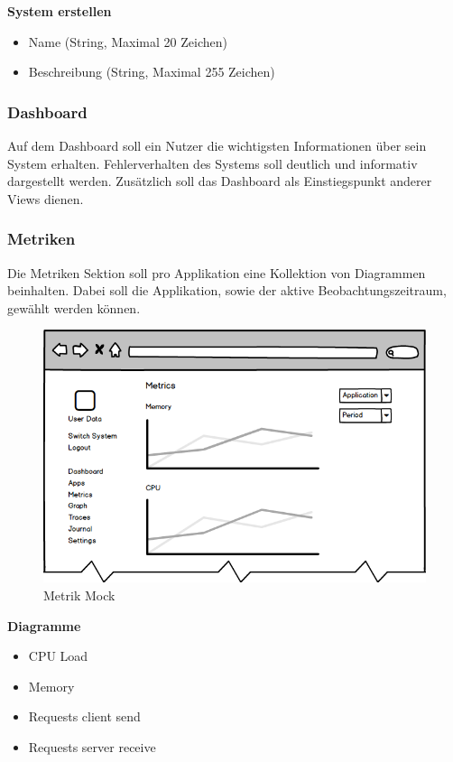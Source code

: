 \textbf{System erstellen}

\begin{itemize}
\item Name (String, Maximal 20 Zeichen)
\item Beschreibung (String, Maximal 255 Zeichen)
\end{itemize}


\subsubsection{Dashboard}

Auf dem Dashboard soll ein Nutzer die wichtigsten Informationen über sein System erhalten.
Fehlerverhalten des Systems soll deutlich und informativ dargestellt werden.
Zusätzlich soll das Dashboard als Einstiegspunkt anderer Views dienen.

\subsubsection{Metriken}

Die Metriken Sektion soll pro Applikation eine Kollektion von Diagrammen beinhalten.
Dabei soll die Applikation, sowie der aktive Beobachtungszeitraum, gewählt werden können.

\begin{figure}[h]
 \centering
 \includegraphics[width=0.6\linewidth]{kapitel1/mocks/metrics.png}
 \caption{Metrik Mock}
  \label{fig:metrics}
\end{figure}

\textbf{Diagramme}

\begin{itemize}
\item CPU Load
\item Memory
\item Requests client send
\item Requests server receive
\end{itemize}


